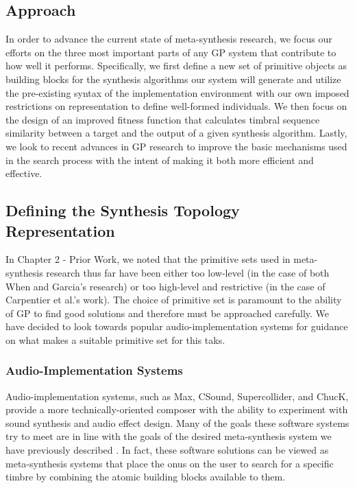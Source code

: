 \documentclass[a4paper,12pt]{report} 	%
\numberwithin{figure}{chapter}
\numberwithin{table}{chapter}
\numberwithin{equation}{chapter}
\begin{document}
\begin{flushleft}
\chapter{Approach} %
In order to advance the current state of meta-synthesis research, we focus our efforts on the three most important parts of any GP system that contribute to how well it performs. Specifically, we first define a new set of primitive objects as building blocks for the synthesis algorithms our system will generate and utilize the pre-existing syntax of the implementation environment with our own imposed restrictions on representation to define well-formed individuals. We then focus on the design of an improved fitness function that calculates timbral sequence similarity between a target and the output of a given synthesis algorithm. Lastly, we look to recent advances in GP research to improve the basic mechanisms used in the search process with the intent of making it both more efficient and effective.

\section{Defining the Synthesis Topology Representation}
In Chapter 2 - Prior Work, we noted that the primitive sets used in meta-synthesis research thus far have been either too low-level (in the case of both When and Garcia's research) or too high-level and restrictive (in the case of Carpentier et al.'s work). The choice of primitive set is paramount to the ability of GP to find good solutions and therefore must be approached carefully. We have decided to look towards popular audio-implementation systems for guidance on what makes a suitable primitive set for this taks.

\subsection{Audio-Implementation Systems}

Audio-implementation systems, such as Max, CSound, Supercollider, and ChucK, provide a more technically-oriented composer with the ability to experiment with sound synthesis and audio effect design. Many of the goals these software systems try to meet are in line with the goals of the desired meta-synthesis system we have previously described \cite{Moreno:2005bs}. In fact, these software solutions can be viewed as meta-synthesis systems that place the onus on the user to search for a specific timbre by combining the atomic building blocks available to them. 


\end{flushleft}
\end{document}

